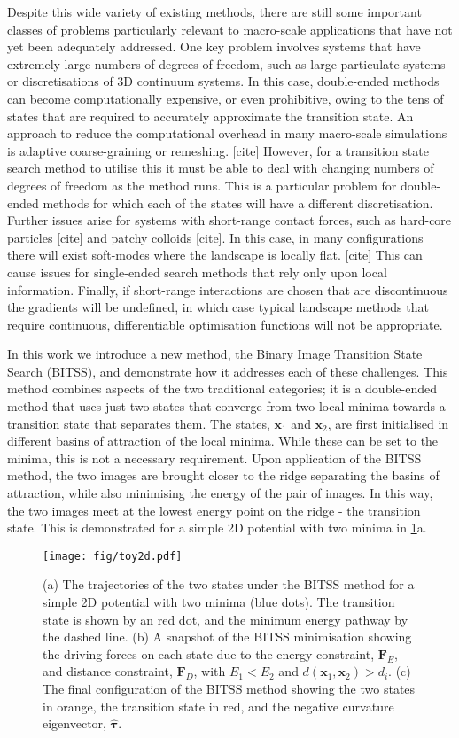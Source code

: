 \documentclass[aps,twocolumn]{revtex4-1}
\newcommand{\temp}[1]{{\leavevmode\color{red}#1}}
\begin{document}
\topic Despite this wide variety of existing methods, there are still some important classes of problems particularly relevant to macro-scale applications that have not yet been adequately addressed.
One key problem involves systems that have extremely large numbers of degrees of freedom, such as large particulate systems or discretisations of 3D continuum systems.
In this case, double-ended methods can become computationally expensive, or even prohibitive, owing to the tens of states that are required to accurately approximate the transition state.
An approach to reduce the computational overhead in many macro-scale simulations is adaptive coarse-graining or remeshing. \temp{[cite]}
However, for a transition state search method to utilise this it must be able to deal with changing numbers of degrees of freedom as the method runs.
This is a particular problem for double-ended methods for which each of the states will have a different discretisation.
Further issues arise for systems with short-range contact forces, such as hard-core particles \temp{[cite]} and patchy colloids \temp{[cite]}.
In this case, in many configurations there will exist soft-modes where the landscape is locally flat. \temp{[cite]}
This can cause issues for single-ended search methods that rely only upon local information.
Finally, if short-range interactions are chosen that are discontinuous the gradients will be undefined, in which case typical landscape methods that require continuous, differentiable optimisation functions will not be appropriate.

\topic In this work we introduce a new method, the Binary Image Transition State Search (BITSS), and demonstrate how it addresses each of these challenges.
This method combines aspects of the two traditional categories; it is a double-ended method that uses just two states that converge from two local minima towards a transition state that separates them.
The states, $\bm{x}_1$ and $\bm{x}_2$, are first initialised in different basins of attraction of the local minima.
While these can be set to the minima, this is not a necessary requirement.
Upon application of the BITSS method, the two images are brought closer to the ridge separating the basins of attraction, while also minimising the energy of the pair of images.
In this way, the two images meet at the lowest energy point on the ridge - the transition state.
This is demonstrated for a simple 2D potential with two minima in \cref{fig:toy2d}a.

\begin{figure}[htb]
  \centering
  \texttt{[image: fig/toy2d.pdf]}
  \caption{
    (a) The trajectories of the two states under the BITSS method for a simple 2D potential with two minima (blue dots).
        The transition state is shown by an red dot, and the minimum energy pathway by the dashed line.
    (b) A snapshot of the BITSS minimisation showing the driving forces on each state due to the energy constraint, $\bm{F}_E$, and distance constraint, $\bm{F}_D$, with $E_1 < E_2$ and $d(\bm{x}_1,\bm{x}_2) > d_i$.
    (c) The final configuration of the BITSS method showing the two states in orange, the transition state in red, and the negative curvature eigenvector, $\bm{\hat{\tau}}$.
  }
  \label{fig:toy2d}
\end{figure}
\end{document}
